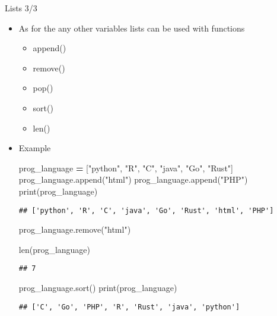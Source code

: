 \documentclass[
  8pt,
  ignorenonframetext,
]{beamer}
\newenvironment{Shaded}{\begin{snugshade}}{\end{snugshade}}
\newcommand{\BuiltInTok}[1]{#1}
\newcommand{\NormalTok}[1]{#1}
\newcommand{\OperatorTok}[1]{\textcolor[rgb]{0.81,0.36,0.00}{\textbf{#1}}}
\newcommand{\StringTok}[1]{\textcolor[rgb]{0.31,0.60,0.02}{#1}}
\providecommand{\tightlist}{%
  \setlength{\itemsep}{0pt}\setlength{\parskip}{0pt}}
\begin{document}
\begin{frame}[fragile]{Lists 3/3}
\protect\hypertarget{lists-33}{}
\begin{itemize}[<+->]
\tightlist
\item
  As for the any other variables lists can be used with functions

  \begin{itemize}[<+->]
  \tightlist
  \item
    append()
  \item
    remove()
  \item
    pop()
  \item
    sort()
  \item
    len()
  \end{itemize}
\end{itemize}

\begin{itemize}[<+->]
\item
  Example

\begin{Shaded}
\begin{Highlighting}[]
\NormalTok{prog\_language }\OperatorTok{=}\NormalTok{ [}\StringTok{"python"}\NormalTok{, }\StringTok{"R"}\NormalTok{, }\StringTok{"C"}\NormalTok{, }\StringTok{"java"}\NormalTok{, }\StringTok{"Go"}\NormalTok{, }\StringTok{"Rust"}\NormalTok{]}
\NormalTok{prog\_language.append(}\StringTok{"html"}\NormalTok{)}
\NormalTok{prog\_language.append(}\StringTok{"PHP"}\NormalTok{)}
\BuiltInTok{print}\NormalTok{(prog\_language)}
\end{Highlighting}
\end{Shaded}

\begin{verbatim}
## ['python', 'R', 'C', 'java', 'Go', 'Rust', 'html', 'PHP']
\end{verbatim}

\begin{Shaded}
\begin{Highlighting}[]
\NormalTok{prog\_language.remove(}\StringTok{"html"}\NormalTok{)}

\BuiltInTok{len}\NormalTok{(prog\_language)}
\end{Highlighting}
\end{Shaded}

\begin{verbatim}
## 7
\end{verbatim}

\begin{Shaded}
\begin{Highlighting}[]
\NormalTok{prog\_language.sort()}
\BuiltInTok{print}\NormalTok{(prog\_language)}
\end{Highlighting}
\end{Shaded}

\begin{verbatim}
## ['C', 'Go', 'PHP', 'R', 'Rust', 'java', 'python']
\end{verbatim}
\end{itemize}
\end{frame}
\end{document}
